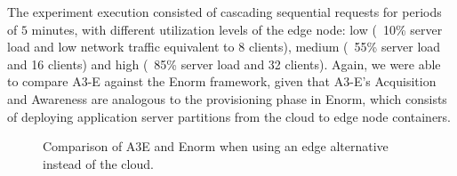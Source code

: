 The experiment execution consisted of cascading sequential requests for periods of $5$ minutes, with different utilization levels of the edge node: low (~10\% server load and low network traffic equivalent to 8 clients), medium (~55\% server load and 16 clients) and high (~85\% server load and 32 clients). Again, we were able to compare A3-E against the Enorm framework, given that A3-E's Acquisition and Awareness are analogous to the provisioning phase in Enorm, which consists of deploying application server partitions from the cloud to edge node containers. 

\begin{figure}[htb]
	\centering
	\captionsetup[subfigure]{width=0.49\textwidth}
	\captionsetup[subfigure]{width=0.49\textwidth}
	\setlength{\belowcaptionskip}{-10pt}
	\caption{Comparison of A3E and Enorm when using an edge alternative instead of the cloud.} \label{fig:exp-a3e-enorm}
\end{figure}


